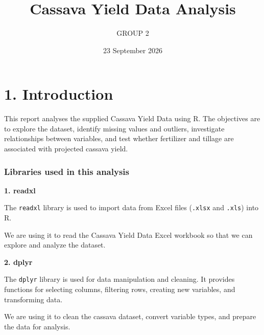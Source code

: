 \documentclass[
]{article}
\title{Cassava Yield Data Analysis}
\author{GROUP 2}
\date{23 September 2026}
\newenvironment{Shaded}{\begin{snugshade}}{\end{snugshade}}
\newcommand{\AttributeTok}[1]{\textcolor[rgb]{0.13,0.29,0.53}{#1}}
\newcommand{\ConstantTok}[1]{\textcolor[rgb]{0.56,0.35,0.01}{#1}}
\newcommand{\FunctionTok}[1]{\textcolor[rgb]{0.13,0.29,0.53}{\textbf{#1}}}
\newcommand{\NormalTok}[1]{#1}
\newcommand{\SpecialCharTok}[1]{\textcolor[rgb]{0.81,0.36,0.00}{\textbf{#1}}}
\newcommand{\StringTok}[1]{\textcolor[rgb]{0.31,0.60,0.02}{#1}}
\begin{document}
\maketitle

{
\setcounter{tocdepth}{2}
\tableofcontents
}
\section{1. Introduction}\label{introduction}

This report analyses the supplied Cassava Yield Data using R. The
objectives are to explore the dataset, identify missing values and
outliers, investigate relationships between variables, and test whether
fertilizer and tillage are associated with projected cassava yield.

\begin{Shaded}
\end{Shaded}

\subsubsection{Libraries used in this
analysis}\label{libraries-used-in-this-analysis}

\textbf{1. readxl}

The \texttt{readxl} library is used to import data from Excel files
(\texttt{.xlsx} and \texttt{.xls}) into R.

We are using it to read the Cassava Yield Data Excel workbook so that we
can explore and analyze the dataset.

\textbf{2. dplyr}

The \texttt{dplyr} library is used for data manipulation and cleaning.
It provides functions for selecting columns, filtering rows, creating
new variables, and transforming data.

We are using it to clean the cassava dataset, convert variable types,
and prepare the data for analysis.
\end{document}
